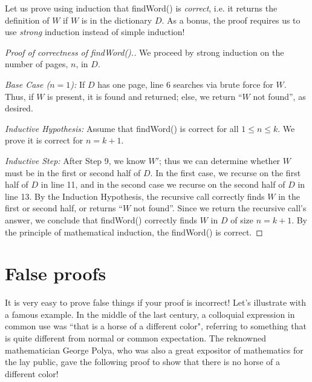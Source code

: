 \documentclass[11pt]{article}
\begin{document}
Let us prove using induction that findWord() is \emph{correct}, i.e. it returns the definition of $W$ if $W$ is in the dictionary $D$. As a bonus, the proof requires us to use \emph{strong} induction instead of simple induction!

\begin{proof}[Proof of correctness of findWord().]
    We proceed by strong induction on the number of pages, $n$, in $D$.

\emph{Base Case ($n = 1$):} If $D$ has one page, line $6$ searches via brute force for $W$. Thus, if $W$ is present, it is found and returned; else, we return ``$W$ not found'', as desired.

\emph{Inductive Hypothesis:} Assume that findWord() is correct for all $1\leq n\leq k$. We prove it is correct for $n=k+1$.

\emph{Inductive Step:} After Step 9, we know $W'$; thus we can determine whether $W$ must be in  the first or second half of $D$. In the first case, we recurse on the first half of $D$ in line 11, and in the second case we recurse on the second half of $D$ in line 13. By the Induction Hypothesis, the recursive call correctly finds $W$ in the first or second half, or returns ``$W$ not found''. Since we return the recursive call's answer, we conclude that findWord() correctly finds $W$ in $D$ of size $n=k+1$. By the principle of mathematical induction, the findWord() is correct.
\end{proof}


\section{False proofs}

It is very easy to prove false things if your proof is incorrect! Let's illustrate with a famous example. In the middle of the last century, a colloquial expression in common use was ``that is a horse of a different color", referring to something that is quite different
from normal or common expectation. The reknowned mathematician George Polya, who was also a
great expositor of mathematics for the lay public, gave the following proof
to show that there is no horse of a different color!
\end{document}

